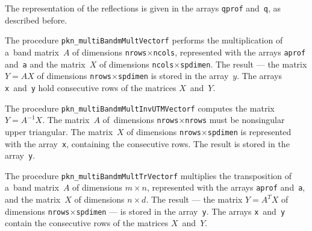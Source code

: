 The representation of the reflections is given in the arrays
\texttt{qprof} and~\texttt{q}, as described before.

\vspace{\bigskipamount}
\begin{sloppypar}
The procedure \texttt{pkn\_multiBandmMultVectorf} performs the multiplication
of a~band matrix~$A$ of dimensions \texttt{nrows}$\times$\texttt{ncols},
represented with the arrays \texttt{aprof} and~\texttt{a} and the matrix~$X$
of dimensions \texttt{ncols}$\times$\texttt{spdimen}. The result --- the matrix
$Y=AX$ of dimensions \texttt{nrows}$\times$\texttt{spdimen} is stored in
the array~$y$. The arrays \texttt{x}~and~\texttt{y} hold consecutive rows
of the matrices $X$~and~$Y$.%
\end{sloppypar}

\vspace{\bigskipamount}
The procedure \texttt{pkn\_multiBandmMultInvUTMVectorf} computes the matrix
$Y=A^{-1}X$. The matrix~$A$ of~dimensions \texttt{nrows}$\times$\texttt{nrows}
must be nonsingular upper triangular. The matrix~$X$ of dimensions
\texttt{nrows}$\times$\texttt{spdimen} is represented with the
array~\texttt{x}, containing the consecutive rows. The result is stored in the
array~\texttt{y}.

\vspace{\bigskipamount}
\begin{sloppypar}
The procedure \texttt{pkn\_multiBandmMultTrVectorf} multiplies the transposition
of a~band matrix~$A$ of dimensions $m\times n$, represented with the arrays
\texttt{aprof} and~\texttt{a}, and the matrix~$X$ of dimensions
$n\times d$. The result --- the matrix $Y=A^TX$
of dimensions \texttt{nrows}$\times$\texttt{spdimen} --- is stored in
the array~\texttt{y}. The arrays \texttt{x}~and~\texttt{y} contain
the consecutive rows of the matrices $X$~and~$Y$.%
\end{sloppypar}

